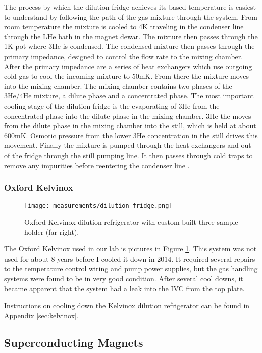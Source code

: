 The process by which the dilution fridge achieves its based temperature is easiest to understand by following the path of the gas mixture through the system. From room temperature the mixture is cooled to 4K traveling in the condenser line through the LHe bath in the magnet dewar. The mixture then passes through the 1K pot where 3He is condensed. The condensed mixture then passes through the primary impedance, designed to control the flow rate to the mixing chamber. After the primary impedance are a series of heat exchangers which use outgoing cold gas to cool the incoming mixture to 50mK. From there the mixture moves into the mixing chamber. The mixing chamber contains two phases of the 3He/4He mixture, a dilute phase and a concentrated phase. The most important cooling stage of the dilution fridge is the evaporating of 3He from the concentrated phase into the dilute phase in the mixing chamber. 3He the moves from the dilute phase in the mixing chamber into the still, which is held at about 600mK. Osmotic pressure from the lower 3He concentration in the still drives this movement. Finally the mixture is pumped through the heat exchangers and out of the fridge through the still pumping line. It then passes through cold traps to remove any impurities before reentering the condenser line \cite{Balshaw2001}.

\subsubsection*{Oxford Kelvinox}

\begin{figure}
    \centering
    \texttt{[image: measurements/dilution\_fridge.png]}
    \caption{Oxford Kelvinox dilution refrigerator with custom built three sample holder (far right).}
    \label{fig:kelvinox}
\end{figure}

The Oxford Kelvinox used in our lab is pictures in Figure \ref{fig:kelvinox}. This system was not used for about 8 years before I cooled it down in 2014. It required several repairs to the temperature control wiring and pump power supplies, but the gas handling systems were found to be in very good condition. After several cool downs, it became apparent that the system had a leak into the IVC from the top plate. 

Instructions on cooling down the Kelvinox dilution refrigerator can be found in Appendix \ref{sec:kelvinox}.

\subsection{Superconducting Magnets}

